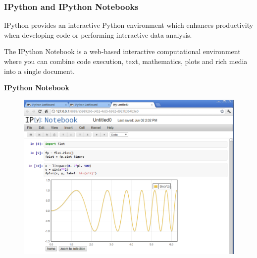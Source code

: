 \documentclass[MASTER.tex]{subfiles}
\begin{document}
\begin{frame}
\frametitle{IPython and IPython Notebooks}
IPython provides an interactive Python environment which enhances productivity when developing code
or performing interactive data analysis.\\ \bigskip

The IPython Notebook is a web-based interactive computational environment where you can combine code execution, text, mathematics, plots and rich media into a single document.
\end{frame}
\begin{frame}
\textbf{IPython Notebook}
	\begin{figure}
\centering
\includegraphics[width=0.9\linewidth]{vk2Q6}

\end{figure}

\end{frame}
\end{document}
